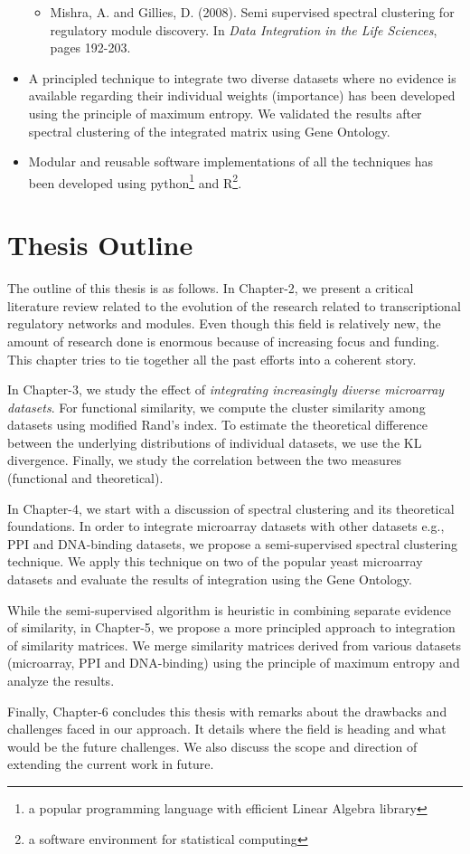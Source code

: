 \begin{itemize}
\begin{itemize}
    		\item Mishra, A. and Gillies, D. (2008). Semi supervised spectral clustering for regulatory module discovery. In \textit{Data Integration in the Life Sciences}, pages 192-203.
 	\end{itemize}
    \item A principled technique to integrate two diverse datasets where no evidence is available regarding their individual weights (importance) has been developed using the principle of maximum entropy. We validated the results after spectral clustering of the integrated matrix using Gene Ontology.
    \item Modular and reusable software implementations of all the techniques has been developed using python\footnote{a popular programming language with efficient Linear Algebra library} and R\footnote{a software environment for statistical computing}.	
\end{itemize}

\section{Thesis Outline}
The outline of this thesis is as follows. In Chapter-2, we present a critical literature review related to the evolution of the research related to transcriptional regulatory networks and modules. Even though this field is relatively new, the amount of research done is enormous because of increasing focus and funding. This chapter tries to tie together all the past efforts into a coherent story. 

In Chapter-3, we study the effect of \textit{integrating increasingly diverse microarray datasets}. For functional similarity, we compute the cluster similarity among datasets using modified Rand's index. To estimate the theoretical difference between the underlying distributions of individual datasets, we use the \ac{KL} divergence. Finally, we study the correlation between the two measures (functional and theoretical).

In Chapter-4, we start with a discussion of spectral clustering and its theoretical foundations. In order to integrate microarray datasets with other datasets e.g., PPI and DNA-binding datasets, we propose a semi-supervised spectral clustering technique. We apply this technique on two of the popular yeast microarray datasets and evaluate the results of integration using the Gene Ontology. 

While the semi-supervised algorithm is heuristic in combining separate evidence of similarity, in Chapter-5, we propose a more principled approach to integration of similarity matrices. We merge similarity matrices derived from various datasets (microarray, PPI and DNA-binding) using the principle of maximum entropy \citep{jaynes57maxent} and analyze the results.

Finally, Chapter-6 concludes this thesis with remarks about the drawbacks and challenges faced in our approach. It details where the field is heading and what would be the future challenges. We also discuss the scope and direction of extending the current work in future. 

